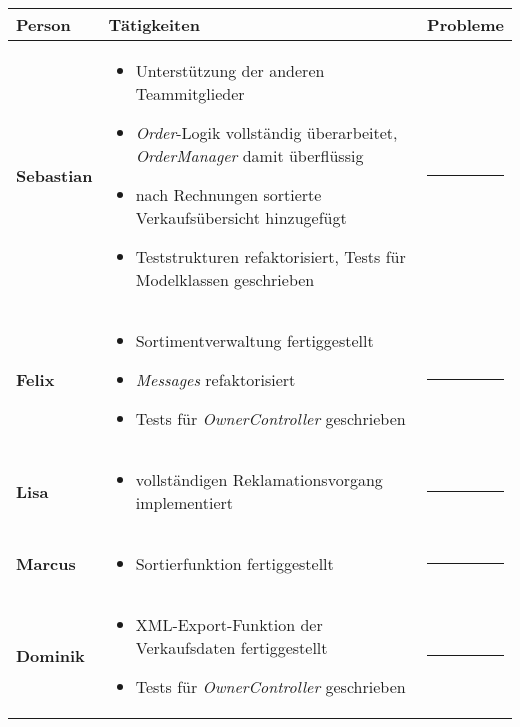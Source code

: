 \documentclass{scrartcl}
\begin{document}
\begin{tabularx}{\textwidth}{p{}p{}X}
\hline
\textsf{\textbf{\large Person}} & \textsf{\textbf{\large Tätigkeiten}} & \textsf{\textbf{\large Probleme}} \\
\hline\hline
\textbf{Sebastian} & 
 \begin{itemize}
 \item Unterstützung der anderen Teammitglieder
 \item \textit{Order}-Logik vollständig überarbeitet, \textit{OrderManager} damit überflüssig
 \item nach Rechnungen sortierte Verkaufsübersicht hinzugefügt
 \item Teststrukturen refaktorisiert, Tests für Modelklassen geschrieben
 \end{itemize}
 & \rule[1ex]{.7cm}{1pt} \\ \hline
\textbf{Felix} & 
 \begin{itemize}
 \item Sortimentverwaltung fertiggestellt
 \item \textit{Messages} refaktorisiert
 \item Tests für \textit{OwnerController} geschrieben
 \end{itemize}
 & \rule[1ex]{.7cm}{1pt} \\ \hline
\textbf{Lisa} & 
 \begin{itemize}
 \item vollständigen Reklamationsvorgang implementiert
 \end{itemize}
& \rule[1ex]{.7cm}{1pt} \\ \hline
\textbf{Marcus} & 
 \begin{itemize}
 \item Sortierfunktion fertiggestellt
 \end{itemize}
& \rule[1ex]{.7cm}{1pt} \\ \hline
\textbf{Dominik} &
 \begin{itemize}
 \item XML-Export-Funktion der Verkaufsdaten fertiggestellt
 \item Tests für \textit{OwnerController} geschrieben
 \end{itemize}
& \rule[1ex]{.7cm}{1pt} \\ \hline
\end{tabularx}\\

\vspace{1em}
\end{document}
